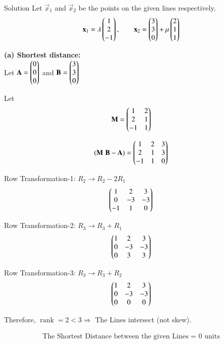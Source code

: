 \documentclass{beamer}
\begin{document}
\begin{frame}{Solution}
    Let $\vec{x}_1$ and $\vec{x}_2$ be the points on the given lines respectively.
\[
\mathbf{x}_1 = \lambda\begin{pmatrix}1\\2\\-1\end{pmatrix}, \qquad 
\mathbf{x}_2 = \begin{pmatrix}3\\3\\0\end{pmatrix} + \mu\begin{pmatrix}2\\1\\1\end{pmatrix}
\]

\textbf{(a) Shortest distance:}\\
Let $\mathbf{A} = \begin{pmatrix}0\\0\\0\end{pmatrix}$ and $\mathbf{B} = \begin{pmatrix}3\\3\\0\end{pmatrix}$

Let
\[
\mathbf{M} = \begin{pmatrix}1 & 2 \\ 2 & 1 \\ -1 & 1\end{pmatrix}
\]

\begin{equation}
    (\mathbf{M} \, \, \mathbf{B}-\mathbf{A}) = \begin{pmatrix}1 & 2 & 3 \\ 2 & 1 & 3 \\ -1 & 1 & 0\end{pmatrix}
\end{equation}

\end{frame}
\begin{frame}
Row Transformation-1: $R_2 \rightarrow R_2 - 2R_1$
\begin{equation}
\begin{pmatrix}1 & 2 & 3 \\ 0 & -3 & -3 \\ -1 & 1 & 0\end{pmatrix}
\end{equation}

Row Transformation-2: $R_3 \rightarrow R_3 + R_1$
\begin{equation}
\begin{pmatrix}1 & 2 & 3 \\ 0 & -3 & -3 \\ 0 & 3 & 3\end{pmatrix}
\end{equation}

Row Transformation-3: $R_3 \rightarrow R_3 + R_2$
\begin{equation}
\begin{pmatrix}1 & 2 & 3 \\ 0 & -3 & -3 \\ 0 & 0 & 0\end{pmatrix}
\end{equation}

Therefore, \(\operatorname{rank}=2 < 3 \Rightarrow\) The Lines intersect (not skew).

\begin{align}
    \boxed{\text{The Shortest Distance between the given Lines = } 0 \text{ units}}
\end{align}
    
\end{frame}
\end{document}

